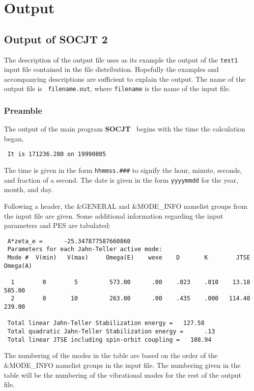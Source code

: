 \documentclass{article}
\newcommand{\socjttwo}{\bf{SOCJT 2 }}
\newcommand{\socjt}{{\bf SOCJT }}
\begin{document}
\section{Output} \label{section:output}

\subsection{Output of \socjttwo }

The description of the output file uses as its example the output of
the {\tt test1} input file contained in the file
distribution. Hopefully the examples and accompanying descriptions are
sufficient to explain the output. The name of the output file is {\tt
  filename.out}, where {\tt filename} is the name of the input file.

\subsubsection{Preamble}

The output of the main program \socjt\ begins with the time the
calculation began,
\begin{verbatim}
 It is 171236.280 on 19990805
\end{verbatim}
The time is given in the form {\tt hhmmss.\#\#\#} to signify the
hour, minute, seconds, and fraction of a second. The date is given in
the form {\tt yyyymmdd} for the year, month, and day.

Following a header, the \&GENERAL and \&MODE\_INFO namelist groups
from the input file are given. Some additional information regarding
the input parameters and PES are tabulated:
\begin{verbatim}
 A*zeta_e =      -25.347877587660860
 Parameters for each Jahn-Teller active mode:
 Mode #  V(min)   V(max)     Omega(E)    wexe    D       K        JTSE  Omega(A)
 
  1        0        5         573.00      .00    .023    .010    13.18    585.00
  2        0       10         263.00      .00    .435    .000   114.40    239.00
 
 Total linear Jahn-Teller Stabilization energy =   127.58
 Total quadratic Jahn-Teller Stabilization energy =      .13
 Total linear JTSE including spin-orbit coupling =   108.94
\end{verbatim}
The numbering of the modes in the table are based on the order of the
\&MODE\_INFO namelist groups in the input file. The numbering given in
the table will be the numbering of the vibrational modes for the rest
of the output file.
\end{document}
